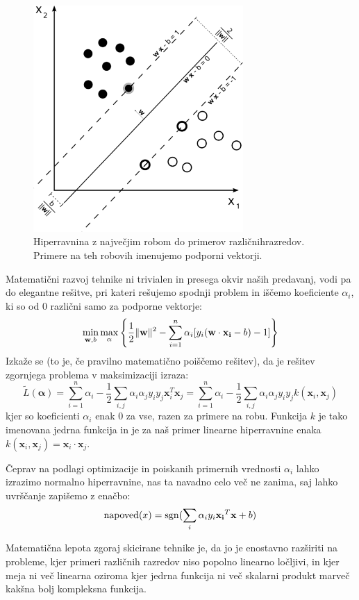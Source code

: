 \begin{figure}[htbp]
\begin{center}
\includegraphics[width=8cm]{slike/svm.png}
\caption{Hiperravnina z največjim robom do primerov različnihrazredov. Primere na teh robovih imenujemo podporni vektorji.}
\label{f-svm}
\end{center}
\end{figure}

Matematični razvoj tehnike ni trivialen in presega okvir naših predavanj, vodi pa do elegantne rešitve, pri kateri rešujemo spodnji problem in iščemo koeficiente $\alpha_i$, ki so od 0 različni samo za podporne vektorje:
%
$$\min_{\mathbf{w},b } \max_{\bf{\alpha} } \left\{ \frac{1}{2}\|\mathbf{w}\|^2 - \sum_{i=1}^{n}{\alpha_i[y_i(\mathbf{w}\cdot \mathbf{x_i} - b)-1]} \right\}
$$
Izkaže se (to je, če pravilno matematično poiščemo rešitev), da je rešitev zgornjega problema v maksimizaciji izraza:
%
$$\tilde{L}(\mathbf{\alpha})=\sum_{i=1}^n \alpha_i - \frac{1}{2}\sum_{i, j} \alpha_i \alpha_j y_i y_j \mathbf{x}_i^T \mathbf{x}_j=\sum_{i=1}^n \alpha_i - \frac{1}{2}\sum_{i, j} \alpha_i \alpha_j y_i y_j k(\mathbf{x}_i, \mathbf{x}_j)$$
%
kjer so koeficienti $\alpha_i$ enak 0 za vse, razen za primere na robu. Funkcija $k$ je tako imenovana jedrna funkcija in je za naš primer linearne hiperravnine enaka
$k(\mathbf{x}_i,\mathbf{x}_j)=\mathbf{x}_i\cdot\mathbf{x}_j$. 

Čeprav na podlagi optimizacije in poiskanih primernih vrednosti $\alpha_i$ lahko izrazimo normalno hiperravnine, nas ta navadno celo več ne zanima, saj lahko uvrščanje zapišemo z enačbo:
%
$${\rm napoved}(x)={\rm sgn}(\sum_i \alpha_i y_i {\bf x_i}^T {\bf x}+b)$$

Matematična lepota zgoraj skicirane tehnike je, da jo je enostavno razširiti na probleme, kjer primeri različnih razredov niso popolno linearno ločljivi, in kjer meja ni več linearna oziroma kjer jedrna funkcija ni več skalarni produkt marveč kakšna bolj kompleksna funkcija.

